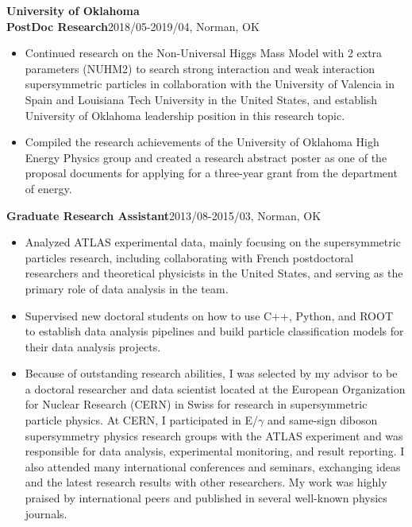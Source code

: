 \documentclass[margin, 10pt]{res} %
\begin{document}
\begin{resume}
\textbf{University of Oklahoma}\\
\textbf{PostDoc Research}\hfill{2018/05-2019/04, Norman, OK}\\
\begin{itemize}
    \item Continued research on the Non-Universal Higgs Mass Model with 2 extra parameters (NUHM2) to search strong interaction and weak interaction supersymmetric particles in collaboration with the University of Valencia in Spain and Louisiana Tech University in the United States, and establish University of Oklahoma leadership position in this research topic.
    \item Compiled the research achievements of the University of Oklahoma High Energy Physics group and created a research abstract poster as one of the proposal documents for applying for a three-year  grant from the department of energy.
\end{itemize}
\textbf{Graduate Research Assistant}\hfill{2013/08-2015/03, Norman, OK}\\
\begin{itemize}
    \item Analyzed ATLAS experimental data, mainly focusing on the supersymmetric particles research, including collaborating with French postdoctoral researchers and theoretical physicists in the United States, and serving as the primary role of data analysis in the team.
    \item Supervised new doctoral students on how to use C++, Python, and ROOT to establish data analysis pipelines and build particle classification models for their data analysis projects.
    \item Because of outstanding research abilities, I was selected by my advisor to be a doctoral researcher and data scientist located at the European Organization for Nuclear Research (CERN) in Swiss for research in supersymmetric particle physics. At CERN, I participated in E/$\gamma$ and same-sign diboson supersymmetry physics research groups with the ATLAS experiment and was responsible for data analysis, experimental monitoring, and result reporting. I also attended many international conferences and seminars, exchanging ideas and the latest research results with other researchers. My work was highly praised by international peers and published in several well-known physics journals.

\end{itemize}
\end{resume}
\end{document}
